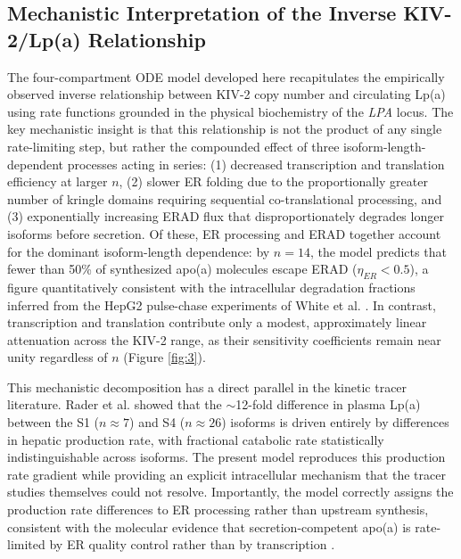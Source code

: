 \documentclass[12pt,letterpaper]{article}
\begin{document}
\subsection{Mechanistic Interpretation of the Inverse KIV-2/Lp(a) Relationship}

The four-compartment ODE model developed here recapitulates the empirically observed inverse relationship between KIV-2 copy number and circulating Lp(a) using rate functions grounded in the physical biochemistry of the \textit{LPA} locus. The key mechanistic insight is that this relationship is not the product of any single rate-limiting step, but rather the compounded effect of three isoform-length-dependent processes acting in series: (1) decreased transcription and translation efficiency at larger $n$, (2) slower ER folding due to the proportionally greater number of kringle domains requiring sequential co-translational processing, and (3) exponentially increasing ERAD flux that disproportionately degrades longer isoforms before secretion. Of these, ER processing and ERAD together account for the dominant isoform-length dependence: by $n = 14$, the model predicts that fewer than 50\% of synthesized apo(a) molecules escape ERAD ($\eta_{ER} < 0.5$), a figure quantitatively consistent with the intracellular degradation fractions inferred from the HepG2 pulse-chase experiments of White et al. \citep{white1994molecular}. In contrast, transcription and translation contribute only a modest, approximately linear attenuation across the KIV-2 range, as their sensitivity coefficients remain near unity regardless of $n$ (Figure \ref{fig:3}).

This mechanistic decomposition has a direct parallel in the kinetic tracer literature. Rader et al. \citep{rader1994inverse} showed that the $\sim$12-fold difference in plasma Lp(a) between the S1 ($n \approx 7$) and S4 ($n \approx 26$) isoforms is driven entirely by differences in hepatic production rate, with fractional catabolic rate statistically indistinguishable across isoforms. The present model reproduces this production rate gradient while providing an explicit intracellular mechanism that the tracer studies themselves could not resolve. Importantly, the model correctly assigns the production rate differences to ER processing rather than upstream synthesis, consistent with the molecular evidence that secretion-competent apo(a) is rate-limited by ER quality control rather than by transcription \citep{white1994molecular,rader1993variation, white1994intracellular, rader1994inverse}.
\end{document}

